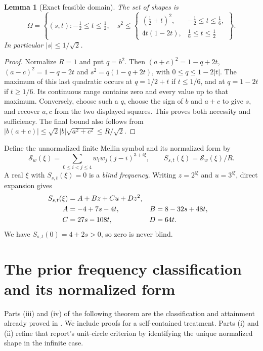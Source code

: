 \documentclass[11pt]{article}
\newtheorem{lemma}[theorem]{Lemma}
\theoremstyle{definition}\newtheorem{definition}[theorem]{Definition}
\theoremstyle{remark}\newtheorem{remark}[theorem]{Remark}
\newcommand{\Shape}{\Omega}
\newcommand{\Sym}{\mathcal S}
\begin{document}
\begin{lemma}[Exact feasible domain]\label{lem:domain}
The set of shapes is
\begin{equation}\label{eq:domain}
 \Shape=\left\{(s,t):-\tfrac12\le t\le\tfrac12,\quad
 s^2\le
 \begin{cases}
 (\tfrac12+t)^2,&-\tfrac12\le t\le\tfrac16,\\
 4t(1-2t),&\tfrac16\le t\le\tfrac12
 \end{cases}\right\}.
\end{equation}
In particular $|s|\le1/\sqrt2$.
\end{lemma}
\begin{proof}
Normalize $R=1$ and put $q=b^2$. Then
$(a+c)^2=1-q+2t$, $(a-c)^2=1-q-2t$ and
$s^2=q(1-q+2t)$, with $0\le q\le1-2|t|$.
The maximum of this last quadratic occurs at $q=1/2+t$ if $t\le1/6$,
and at $q=1-2t$ if $t\ge1/6$. Its continuous range contains zero and every
value up to that maximum. Conversely, choose such a $q$, choose the sign of $b$
and $a+c$ to give $s$, and recover $a,c$ from the two displayed squares.
This proves both necessity and sufficiency. The final bound also follows from
$|b(a+c)|\le\sqrt2|b|\sqrt{a^2+c^2}\le R/\sqrt2$.
\end{proof}

Define the unnormalized finite Mellin symbol and its normalized form by
\begin{equation}\label{eq:symboldef}
 \Sym_w(\xi)=\sum_{0\le i<j\le4}w_iw_j(j-i)^{3+\ii\xi},\qquad
 S_{s,t}(\xi)=\Sym_w(\xi)/R.
\end{equation}
A real $\xi$ with $S_{s,t}(\xi)=0$ is a \emph{blind frequency}.
Writing $z=2^{\ii\xi}$ and $u=3^{\ii\xi}$, direct expansion gives
\begin{align}\label{eq:symbol}
 S_{s,t}(\xi)&=A+Bz+Cu+Dz^2,\\
 A&=-4+7s-4t,& B&=8-32s+48t,\notag\\
 C&=27s-108t,&D&=64t.\notag
\end{align}
We have $S_{s,t}(0)=4+2s>0$, so zero is never blind.

\section{The prior frequency classification and its normalized form}

Parts (iii) and (iv) of the following theorem are the classification and attainment
already proved in \cite{FiveNodePrior}. We include proofs for a self-contained treatment.
Parts (i) and (ii) refine that report's unit-circle criterion by identifying the unique
normalized shape in the infinite case.
\end{document}
